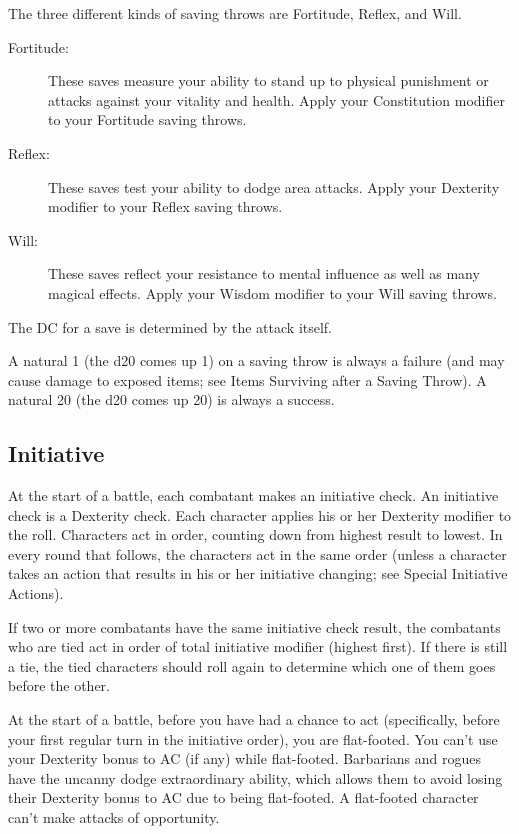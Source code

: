 \vspace*{10pt}

The three different kinds of saving throws are Fortitude, Reflex, and Will.

\begin{description}
	\item[Fortitude:]These saves measure your ability to stand up to physical punishment or attacks against your vitality and health. Apply your Constitution modifier to your Fortitude saving throws.
	\item[Reflex:]These saves test your ability to dodge area attacks. Apply your Dexterity modifier to your Reflex saving throws.
	\item[Will:]These saves reflect your resistance to mental influence as well as many magical effects. Apply your Wisdom modifier to your Will saving throws.
\end{description}

The DC for a save is determined by the attack itself.

A natural 1 (the d20 comes up 1) on a saving throw is always a failure (and may cause damage to exposed items; see Items Surviving after a Saving Throw). A natural 20 (the d20 comes up 20) is always a success.

\subsection{Initiative}

At the start of a battle, each combatant makes an initiative check. An initiative check is a Dexterity check. Each character applies his or her Dexterity modifier to the roll. Characters act in order, counting down from highest result to lowest. In every round that follows, the characters act in the same order (unless a character takes an action that results in his or her initiative changing; see Special Initiative Actions).

If two or more combatants have the same initiative check result, the combatants who are tied act in order of total initiative modifier (highest first). If there is still a tie, the tied characters should roll again to determine which one of them goes before the other.

At the start of a battle, before you have had a chance to act (specifically, before your first regular turn in the initiative order), you are flat-footed. You can't use your Dexterity bonus to AC (if any) while flat-footed. Barbarians and rogues have the uncanny dodge extraordinary ability, which allows them to avoid losing their Dexterity bonus to AC due to being flat-footed. A flat-footed character can't make attacks of opportunity.

